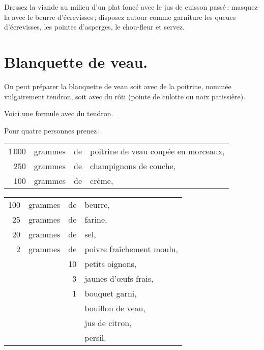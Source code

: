 Dressez la viande au milieu d'un plat foncé avec le jus de cuisson passé ;
masquez-la avec le beurre d'écrevisses ; disposez autour comme garniture les
queues d'écrevisses, les pointes d'asperges, le chou-fleur et servez.

\section*{\centering Blanquette de veau.}
{}

On peut préparer la blanquette de veau soit avec de la poitrine, nommée
vulgairement tendron, soit avec du rôti (pointe de culotte ou noix patissière).

Voici une formule avec du tendron.

\medskip

Pour quatre personnes prenez :

\footnotesize
\begin{longtable}{rrrp{16em}}
  1 000 & grammes & de & poitrine de veau coupée en morceaux,                                             \\
    250 & grammes & de & champignons de couche,                                                           \\
    100 & grammes & de & crème,                                                                           \\
\end{longtable}
\normalsize

\medskip

\footnotesize
\begin{longtable}{rrrp{16em}}
  100 & grammes & de & beurre,                                                                            \\
   25 & grammes & de & farine,                                                                            \\
   20 & grammes & de & sel,                                                                               \\
    2 & grammes & de & poivre fraîchement moulu,                                                          \\
      &         & 10 & petits oignons,                                                                    \\
      &         &  3 & jaunes d'œufs frais,                                                               \\
      &         &  1 & bouquet garni,                                                                     \\
      &         &    & bouillon de veau,                                                                  \\
      &         &    & jus de citron,                                                                     \\
      &         &    & persil.                                                                            \\
\end{longtable}
\normalsize


